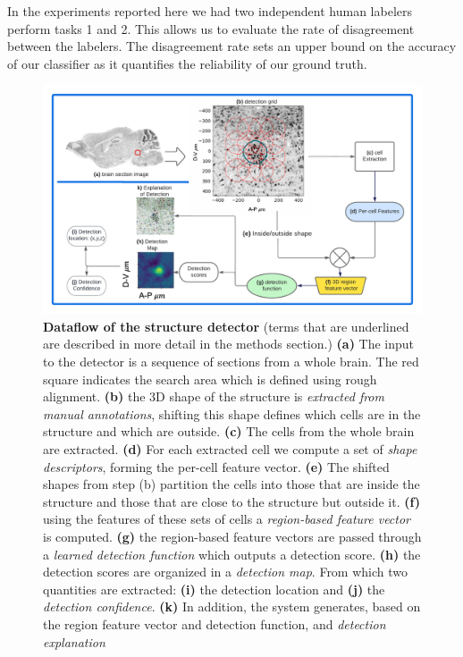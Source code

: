 \documentclass[11pt]{article}
\begin{document}
In the experiments reported here we had two independent human labelers
perform tasks 1 and 2. This allows us to evaluate the rate of
disagreement between the labelers. The disagreement rate sets an upper
bound on the accuracy of our classifier as it quantifies the
reliability of our ground truth.

%

\begin{figure}[t]
  \includegraphics[width=\textwidth]{figures/detection.pdf}
  \caption{\label{fig:detector} {\bf Dataflow of the structure
      detector} (terms that are underlined are described in more
    detail in the methods section.) {\bf (a)} The input to the detector
    is a sequence of sections from a whole brain. The red square
    indicates the search area which is defined using rough
    alignment. {\bf (b)} the 3D shape of the structure is {\em
      extracted from manual annotations},
    shifting this shape defines which cells are in the structure and
    which are outside. {\bf (c)} The cells from the whole brain are
    extracted. {\bf (d)} For each extracted cell we compute a set of
    {\em shape descriptors}, forming the per-cell feature vector. {\bf (e)}
    The shifted shapes from step (b) partition the cells into those
    that are inside the structure and those that are close to the
    structure but outside it. {\bf (f)} using the features of these
    sets of cells a {\em region-based feature vector} is
    computed. {\bf (g)} the region-based feature vectors are passed
    through a {\em learned detection function} which outputs a
    detection score. {\bf (h)} the detection scores are organized in
    a {\em detection map}. From which two quantities are extracted:
    {\bf (i)} the detection location and {\bf (j)} the {\em detection
      confidence}. {\bf (k)} In addition, the system generates, based on the
    region feature vector and detection function, and {\em detection
      explanation}}
\end{figure}
\end{document}
